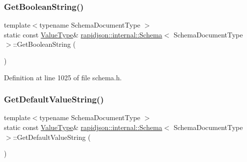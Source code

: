 \subsubsection{\texorpdfstring{GetBooleanString()}{GetBooleanString()}}
{\footnotesize\ttfamily template$<$typename Schema\+Document\+Type $>$ \\
static const \mbox{\hyperlink{classrapidjson_1_1internal_1_1_schema_a3979a9083c598195927c08c6e3ba91d1}{Value\+Type}}\& \mbox{\hyperlink{classrapidjson_1_1internal_1_1_schema}{rapidjson\+::internal\+::\+Schema}}$<$ Schema\+Document\+Type $>$\+::Get\+Boolean\+String (\begin{DoxyParamCaption}{ }\end{DoxyParamCaption})\hspace{0.3cm}{\ttfamily [static]}}



Definition at line 1025 of file schema.\+h.


\begin{DoxyCode}{0}

\end{DoxyCode}
\mbox{\label{classrapidjson_1_1internal_1_1_schema_a814affe73ad5644e50944cfac603ebe6}} 
\subsubsection{\texorpdfstring{GetDefaultValueString()}{GetDefaultValueString()}}
{\footnotesize\ttfamily template$<$typename Schema\+Document\+Type $>$ \\
static const \mbox{\hyperlink{classrapidjson_1_1internal_1_1_schema_a3979a9083c598195927c08c6e3ba91d1}{Value\+Type}}\& \mbox{\hyperlink{classrapidjson_1_1internal_1_1_schema}{rapidjson\+::internal\+::\+Schema}}$<$ Schema\+Document\+Type $>$\+::Get\+Default\+Value\+String (\begin{DoxyParamCaption}{ }\end{DoxyParamCaption})\hspace{0.3cm}{\ttfamily [static]}}



